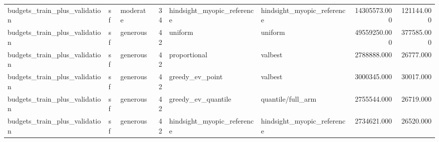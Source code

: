 \begin{tabular}{lllrllrr}
budgets\_train\_plus\_validation & sf & moderate & 34 & hindsight\_myopic\_reference & hindsight\_myopic\_reference & 14305573.000 & 121144.000 \\
budgets\_train\_plus\_validation & sf & generous & 42 & uniform & uniform & 49559250.000 & 377585.000 \\
budgets\_train\_plus\_validation & sf & generous & 42 & proportional & valbest & 2788888.000 & 26777.000 \\
budgets\_train\_plus\_validation & sf & generous & 42 & greedy\_ev\_point & valbest & 3000345.000 & 30017.000 \\
budgets\_train\_plus\_validation & sf & generous & 42 & greedy\_ev\_quantile & quantile/full\_arm & 2755544.000 & 26719.000 \\
budgets\_train\_plus\_validation & sf & generous & 42 & hindsight\_myopic\_reference & hindsight\_myopic\_reference & 2734621.000 & 26520.000 \\
\bottomrule
\end{tabular}
